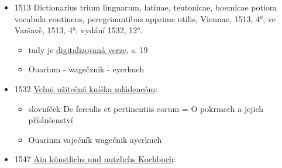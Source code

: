 \begin{itemize}
  \begin{itemize}
  \tightlist
  \item
     z litýho těsta,  :

    \begin{itemize}
    \tightlist
    \item
      \emph{Pečené mléko}
    \item
      Pečené mléko připrav takto: Vezmi trochu mouky a dobře ji
      rozmíchej s dobrým mlékem. Potom do něj rozklepni vejce a přidej
      trochu tuku. Směs nechávej kapat na rozpálený rožeň. Tak připravíš
      dobré pečené mléko. Jak mléko na rožeň kape, rožněm otáčej. Můžeš
      také přidat dobré koření.
    \end{itemize}
  \item
    aktuálně asi nejstarší verze receptu z litýho těsta
  \item
    recept je z rukopisu co pochází asi z let 1490 až 1510, je uložený v
    Zentralbibliothek Solothurn jako S 392
  \end{itemize}
\item
  1513 Dictionarius trium linguarum, latinae, teutonicae, boemicae
  potiora vocabula continens, peregrinantibus apprime utilis, Viennae,
  1513, 4°; ve Varšavě, 1513, 4°; vydání 1532, 12°.

  \begin{itemize}
  \tightlist
  \item
    tady je
    \href{https://dbc.wroc.pl/dlibra/publication/33643/edition/30385/content?ref=L3B1YmxpY2F0aW9uLzM0Njg5L2VkaXRpb24vMzE0MTQ}{digitalizovaná
    verze}, s. 19
  \item
    Ouarium - wagečznik - eyerkuch
  \end{itemize}
\item
  1532
  \href{https://bara.ujc.cas.cz/slovniky/slovknm/slovknm31.html\#CTX1129}{Velmi
  užitečná kníška mládencóm}:

  \begin{itemize}
  \tightlist
  \item
    slovníček De ferculis et pertinentiis eorum = O pokrmech a jejich
    příslušenství
  \item
    Ouarium \textbar{} vaječník \textbar{} wagečnik \textbar{} ayerkuch
  \end{itemize}
\item
  1547
  \href{https://www.digitale-sammlungen.de/view/bsb00023833?page=72\%2C73}{Ain
  künstlichs und nutzlichs Kochbuch}:


\end{itemize}
